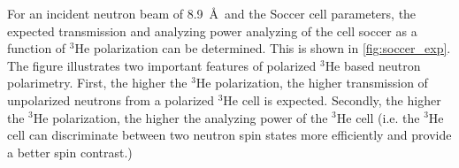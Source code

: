 For an incident neutron beam of 8.9~\AA\ and the Soccer cell parameters, the expected transmission and analyzing power analyzing of the cell soccer as a function of $^3$He polarization can be determined. This is shown in \cref{fig:soccer_exp}. The figure illustrates two important features of polarized $^3$He based neutron polarimetry. First, the higher the $^3$He polarization, the higher transmission of unpolarized neutrons from a polarized $^3$He cell is expected. Secondly, the higher the $^3$He polarization, the higher the analyzing power of the $^3$He cell (i.e. the $^3$He cell can discriminate between two neutron spin states more efficiently and provide a better spin contrast.)


